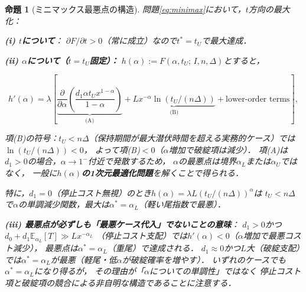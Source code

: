 \documentclass[12pt,a4paper]{article}
\theoremstyle{plain}
\newtheorem{proposition}[theorem]{命題}
\theoremstyle{definition}
\theoremstyle{remark}
\newcommand{\E}{\mathbb{E}}
\begin{document}
\begin{proposition}[ミニマックス最悪点の構造]\label{prop:minimax}
問題\eqref{eq:minimax}において，$t$方向の最大化：

\textbf{(i) $t$について}：
$\partial F/\partial t>0$（常に成立）なので$t^*=t_U$で最大達成．

\textbf{(ii) $\alpha$について（$t=t_U$固定）：}
$h(\alpha):=F(\alpha,t_U;\,I,n,\Delta)$とすると，

\begin{equation}\label{eq:h_deriv}
  h'(\alpha)=\lambda\left[
  \underbrace{\frac{\partial}{\partial\alpha}\!\left(\frac{d_1\alpha t_U x^{1-\alpha}}{1-\alpha}\right)}_{\text{(A)}}
  +\underbrace{L x^{-\alpha}\ln(t_U/(n\Delta))}_{\text{(B)}}
  +\text{lower-order terms}
  \right],
\end{equation}

項(B)の符号：$t_U<n\Delta$（保持期間が最大潜伏時間を超える実務的ケース）では$\ln(t_U/(n\Delta))<0$，
よって項(B)$<0$（$\alpha$増加で破綻項は減少）．
項(A)は$d_1>0$の場合，$\alpha\to1^-$付近で発散するため，
$\alpha$の最悪点は境界$\alpha_L$または$\alpha_U$ではなく，
一般に\textbf{$h(\alpha)$の1次元最適化問題}を解くことで得られる．

特に，$d_1=0$（停止コスト無視）のとき$h(\alpha)=\lambda L(t_U/(n\Delta))^{\alpha}$は
$t_U<n\Delta$で$\alpha$の単調減少関数，最大は$\alpha^*=\alpha_L$（軽い尾指数で最悪）．

\textbf{(iii) 最悪点が必ずしも「最悪ケース代入」でないことの意味}：
$d_1>0$かつ$d_0+d_1\E_{\alpha_L}[T]\gg Lx^{-\alpha_L}$
（停止コスト支配）では$h'(\alpha)<0$（$\alpha$増加で最悪コスト減少），
最悪点は$\alpha^*=\alpha_L$（重尾）で達成される．
$d_1\approx0$かつ$L$大（破綻支配）では$\alpha^*=\alpha_L$が最悪（軽尾・低$\alpha$が破綻確率を増やす）．
いずれのケースでも$\alpha^*=\alpha_L$になり得るが，
その理由が「$\alpha$についての単調性」ではなく
\emph{停止コスト項と破綻項の競合}による非自明な構造であることに注意する．
\end{proposition}
\end{document}
